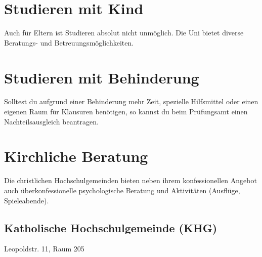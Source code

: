 \begin{urlList}
\end{urlList}

\section{Studieren mit Kind}

Auch für Eltern ist Studieren absolut nicht unmöglich. Die Uni bietet diverse Beratungs- und Betreuungsmöglichkeiten.

\begin{urlList}
\end{urlList}

\section{Studieren mit Behinderung}

Solltest du aufgrund einer Behinderung mehr Zeit, spezielle Hilfsmittel oder einen eigenen Raum für Klausuren benötigen, so kannst du beim Prüfungsamt einen Nachteilsausgleich beantragen.

\begin{urlList}
\end{urlList}



\section{Kirchliche Beratung}
Die christlichen Hochschulgemeinden bieten neben ihrem konfessionellen Angebot auch überkonfessionelle psychologische Beratung und Aktivitäten (Ausflüge, Spieleabende).

\subsection*{Katholische Hochschulgemeinde (KHG)}
Leopoldstr. 11, Raum 205

\begin{urlList}
\end{urlList}

